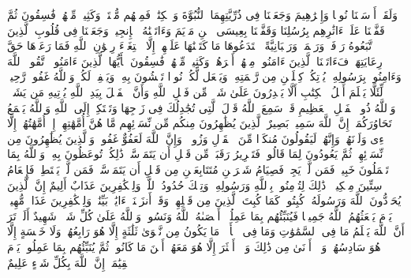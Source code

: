 \startbuffer[\q:57:26]
وَلَقَدۡ أَرۡسَلۡنَا نُوحࣰا وَإِبۡرَٰهِیمَ وَجَعَلۡنَا فِی ذُرِّیَّتِهِمَا ٱلنُّبُوَّةَ وَٱلۡكِتَٰبَۖ فَمِنۡهُم مُّهۡتَدࣲۖ وَكَثِیرࣱ مِّنۡهُمۡ فَٰسِقُونَ%
\stopbuffer%
\startbuffer[\q:57:27]
ثُمَّ قَفَّیۡنَا عَلَىٰۤ ءَاثَٰرِهِم بِرُسُلِنَا وَقَفَّیۡنَا بِعِیسَى ٱبۡنِ مَرۡیَمَ وَءَاتَیۡنَٰهُ ٱلۡإِنجِیلَۖ وَجَعَلۡنَا فِی قُلُوبِ ٱلَّذِینَ ٱتَّبَعُوهُ رَأۡفَةࣰ وَرَحۡمَةࣰۚ وَرَهۡبَانِیَّةً ٱبۡتَدَعُوهَا مَا كَتَبۡنَٰهَا عَلَیۡهِمۡ إِلَّا ٱبۡتِغَاۤءَ رِضۡوَٰنِ ٱللَّهِ فَمَا رَعَوۡهَا حَقَّ رِعَایَتِهَاۖ فَءَاتَیۡنَا ٱلَّذِینَ ءَامَنُوا۟ مِنۡهُمۡ أَجۡرَهُمۡۖ وَكَثِیرࣱ مِّنۡهُمۡ فَٰسِقُونَ%
\stopbuffer%
\startbuffer[\q:57:28]
یَٰۤأَیُّهَا ٱلَّذِینَ ءَامَنُوا۟ ٱتَّقُوا۟ ٱللَّهَ وَءَامِنُوا۟ بِرَسُولِهِۦ یُؤۡتِكُمۡ كِفۡلَیۡنِ مِن رَّحۡمَتِهِۦ وَیَجۡعَل لَّكُمۡ نُورࣰا تَمۡشُونَ بِهِۦ وَیَغۡفِرۡ لَكُمۡۚ وَٱللَّهُ غَفُورࣱ رَّحِیمࣱ%
\stopbuffer%
\startbuffer[\q:57:29]
لِّئَلَّا یَعۡلَمَ أَهۡلُ ٱلۡكِتَٰبِ أَلَّا یَقۡدِرُونَ عَلَىٰ شَیۡءࣲ مِّن فَضۡلِ ٱللَّهِ وَأَنَّ ٱلۡفَضۡلَ بِیَدِ ٱللَّهِ یُؤۡتِیهِ مَن یَشَاۤءُۚ وَٱللَّهُ ذُو ٱلۡفَضۡلِ ٱلۡعَظِیمِ%
\stopbuffer%
\startbuffer[\q:58:1]
قَدۡ سَمِعَ ٱللَّهُ قَوۡلَ ٱلَّتِی تُجَٰدِلُكَ فِی زَوۡجِهَا وَتَشۡتَكِیۤ إِلَى ٱللَّهِ وَٱللَّهُ یَسۡمَعُ تَحَاوُرَكُمَاۤۚ إِنَّ ٱللَّهَ سَمِیعُۢ بَصِیرٌ%
\stopbuffer%
\startbuffer[\q:58:2]
ٱلَّذِینَ یُظَٰهِرُونَ مِنكُم مِّن نِّسَاۤئِهِم مَّا هُنَّ أُمَّهَٰتِهِمۡۖ إِنۡ أُمَّهَٰتُهُمۡ إِلَّا ٱلَّٰۤءِی وَلَدۡنَهُمۡۚ وَإِنَّهُمۡ لَیَقُولُونَ مُنكَرࣰا مِّنَ ٱلۡقَوۡلِ وَزُورࣰاۚ وَإِنَّ ٱللَّهَ لَعَفُوٌّ غَفُورࣱ%
\stopbuffer%
\startbuffer[\q:58:3]
وَٱلَّذِینَ یُظَٰهِرُونَ مِن نِّسَاۤئِهِمۡ ثُمَّ یَعُودُونَ لِمَا قَالُوا۟ فَتَحۡرِیرُ رَقَبَةࣲ مِّن قَبۡلِ أَن یَتَمَاۤسَّاۚ ذَٰلِكُمۡ تُوعَظُونَ بِهِۦۚ وَٱللَّهُ بِمَا تَعۡمَلُونَ خَبِیرࣱ%
\stopbuffer%
\startbuffer[\q:58:4]
فَمَن لَّمۡ یَجِدۡ فَصِیَامُ شَهۡرَیۡنِ مُتَتَابِعَیۡنِ مِن قَبۡلِ أَن یَتَمَاۤسَّاۖ فَمَن لَّمۡ یَسۡتَطِعۡ فَإِطۡعَامُ سِتِّینَ مِسۡكِینࣰاۚ ذَٰلِكَ لِتُؤۡمِنُوا۟ بِٱللَّهِ وَرَسُولِهِۦۚ وَتِلۡكَ حُدُودُ ٱللَّهِۗ وَلِلۡكَٰفِرِینَ عَذَابٌ أَلِیمٌ%
\stopbuffer%
\startbuffer[\q:58:5]
إِنَّ ٱلَّذِینَ یُحَاۤدُّونَ ٱللَّهَ وَرَسُولَهُۥ كُبِتُوا۟ كَمَا كُبِتَ ٱلَّذِینَ مِن قَبۡلِهِمۡۚ وَقَدۡ أَنزَلۡنَاۤ ءَایَٰتِۭ بَیِّنَٰتࣲۚ وَلِلۡكَٰفِرِینَ عَذَابࣱ مُّهِینࣱ%
\stopbuffer%
\startbuffer[\q:58:6]
یَوۡمَ یَبۡعَثُهُمُ ٱللَّهُ جَمِیعࣰا فَیُنَبِّئُهُم بِمَا عَمِلُوۤا۟ۚ أَحۡصَىٰهُ ٱللَّهُ وَنَسُوهُۚ وَٱللَّهُ عَلَىٰ كُلِّ شَیۡءࣲ شَهِیدٌ%
\stopbuffer%
\startbuffer[\q:58:7]
أَلَمۡ تَرَ أَنَّ ٱللَّهَ یَعۡلَمُ مَا فِی ٱلسَّمَٰوَٰتِ وَمَا فِی ٱلۡأَرۡضِۖ مَا یَكُونُ مِن نَّجۡوَىٰ ثَلَٰثَةٍ إِلَّا هُوَ رَابِعُهُمۡ وَلَا خَمۡسَةٍ إِلَّا هُوَ سَادِسُهُمۡ وَلَاۤ أَدۡنَىٰ مِن ذَٰلِكَ وَلَاۤ أَكۡثَرَ إِلَّا هُوَ مَعَهُمۡ أَیۡنَ مَا كَانُوا۟ۖ ثُمَّ یُنَبِّئُهُم بِمَا عَمِلُوا۟ یَوۡمَ ٱلۡقِیَٰمَةِۚ إِنَّ ٱللَّهَ بِكُلِّ شَیۡءٍ عَلِیمٌ%
